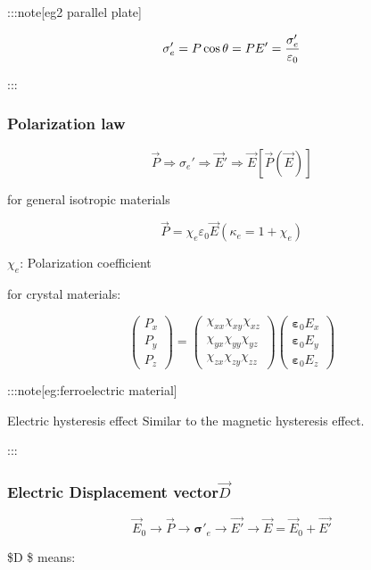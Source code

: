 \documentclass[
]{article}
\begin{document}
:::note{[}eg2 parallel plate{]}

\[
\sigma_e'=P\cos \theta =P\\
E'=\frac{\sigma_e'}{\varepsilon_0}
\]

:::

\hypertarget{polarization-law}{%
\subsubsection{Polarization law}\label{polarization-law}}

\[
\vec P\Rightarrow \sigma_e'\Rightarrow \vec E'\Rightarrow \vec E[\vec P(\vec E)]
\]

for general isotropic materials

\[
\vec{P}=\chi_e\varepsilon_0\vec{E}(\kappa _e=1+\chi_e)
\]

\(\chi _e\): Polarization coefficient

for crystal materials:

\[
\begin{pmatrix}P_x\\P_y\\P_z\end{pmatrix}=\begin{pmatrix}\chi_{xx}\chi_{xy}\chi_{xz}\\\chi_{yx}\chi_{yy}\chi_{yz}\\\chi_{zx}\chi_{zy}\chi_{zz}\end{pmatrix}\begin{pmatrix}\boldsymbol{\varepsilon}_0E_x\\\boldsymbol{\varepsilon}_0E_y\\\boldsymbol{\varepsilon}_0E_z\end{pmatrix}
\]

:::note{[}eg:ferroelectric material{]}

Electric hysteresis effect Similar to the magnetic hysteresis effect.

:::

\hypertarget{electric-displacement-vectorvec-d}{%
\subsubsection{\texorpdfstring{Electric Displacement
vector\(\vec D\)}{Electric Displacement vector\textbackslash vec D}}\label{electric-displacement-vectorvec-d}}

\[
\vec{E}_0\to\vec{P}\to\boldsymbol{\sigma'}_e\to\vec{E'}\to\vec{E}=\vec{E}_0+\vec{E'}
\]

\$\vec D \$ means:
\end{document}

